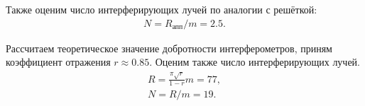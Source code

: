 \begin{enumerate}
    Также оценим число интерферирующих лучей по аналогии с решёткой:
    \begin{gather*}
        N = R_{\text{апп}} / m = 2.5.
    \end{gather*}
    
    Рассчитаем теоретическое значение добротности интерферометров, приням коэффициент отражения $r \approx 0.85$. Оценим также число интерферирующих лучей.
    \begin{gather*}
        R = \frac{\pi \sqrt{r}}{1 - r} m = 77, \\
        N = R / m = 19.
    \end{gather*}
    
    
    
\end{enumerate}


